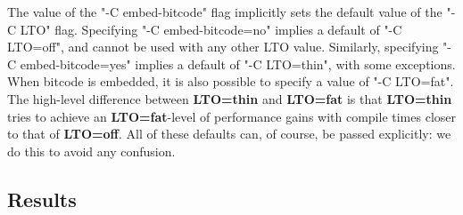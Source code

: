 \documentclass{article}
\begin{document}
The value of the "-C embed-bitcode" flag implicitly sets the default value of the "-C LTO" flag. %
%
Specifying "-C embed-bitcode=no" implies a default of "-C LTO=off", and cannot be used with any other LTO value. %
%
Similarly, specifying "-C embed-bitcode=yes" implies a default of "-C LTO=thin", with some exceptions.
%
When bitcode is embedded, it is also possible to specify a value of "-C LTO=fat". 
%
The high-level difference between \textbf{LTO=thin} and \textbf{LTO=fat} is that \textbf{LTO=thin} tries to achieve an \textbf{LTO=fat}-level of performance gains with compile times closer to that of \textbf{LTO=off}. 
%
All of these defaults can, of course, be passed explicitly: we do this to avoid any confusion. 

\subsection{Results}
\medskip
\end{document}
